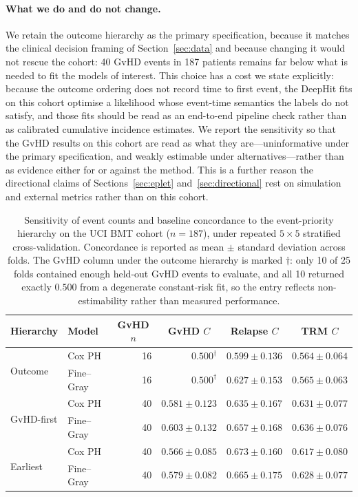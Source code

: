 \documentclass[11pt,a4paper]{article}
\begin{document}
\paragraph{What we do and do not change.}
We retain the outcome hierarchy as the primary specification, because it
matches the clinical decision framing of Section~\ref{sec:data} and because
changing it would not rescue the cohort: 40 GvHD events in 187 patients
remains far below what is needed to fit the models of interest.  This choice
has a cost we state explicitly: because the outcome ordering does not record
time to first event, the DeepHit fits on this cohort optimise a likelihood
whose event-time semantics the labels do not satisfy, and those fits should be
read as an end-to-end pipeline check rather than as calibrated cumulative
incidence estimates.  We report the
sensitivity so that the GvHD results on this cohort are read as what they
are---uninformative under the primary specification, and weakly estimable
under alternatives---rather than as evidence either for or against the
method.  This is a further reason the directional claims of
Sections~\ref{sec:eplet} and~\ref{sec:directional} rest on simulation and
external metrics rather than on this cohort.

\begin{table}[ht]
\centering
\caption{Sensitivity of event counts and baseline concordance to the
  event-priority hierarchy on the UCI BMT cohort ($n=187$), under repeated
  $5\times5$ stratified cross-validation.  Concordance is reported as
  mean $\pm$ standard deviation across folds.  The GvHD column under the
  outcome hierarchy is marked $\dagger$: only 10 of 25 folds contained enough
  held-out GvHD events to evaluate, and all 10 returned exactly $0.500$ from a
  degenerate constant-risk fit, so the entry reflects non-estimability rather
  than measured performance.}
\label{tab:hierarchy}
\small
\begin{tabular}{llrrrr}
\toprule
Hierarchy & Model & \multicolumn{1}{c}{GvHD $n$} & \multicolumn{1}{c}{GvHD $C$}
 & \multicolumn{1}{c}{Relapse $C$} & \multicolumn{1}{c}{TRM $C$} \\
\midrule
\multirow{2}{*}{Outcome}
  & Cox PH    & 16 & $0.500^{\dagger}$ & $0.599 \pm 0.136$ & $0.564 \pm 0.064$ \\
  & Fine--Gray & 16 & $0.500^{\dagger}$ & $0.627 \pm 0.153$ & $0.565 \pm 0.063$ \\
\midrule
\multirow{2}{*}{GvHD-first}
  & Cox PH    & 40 & $0.581 \pm 0.123$ & $0.635 \pm 0.167$ & $0.631 \pm 0.077$ \\
  & Fine--Gray & 40 & $0.603 \pm 0.132$ & $0.657 \pm 0.168$ & $0.636 \pm 0.076$ \\
\midrule
\multirow{2}{*}{Earliest}
  & Cox PH    & 40 & $0.566 \pm 0.085$ & $0.673 \pm 0.160$ & $0.617 \pm 0.080$ \\
  & Fine--Gray & 40 & $0.579 \pm 0.082$ & $0.665 \pm 0.175$ & $0.628 \pm 0.077$ \\
\bottomrule
\end{tabular}
\end{table}
\end{document}
